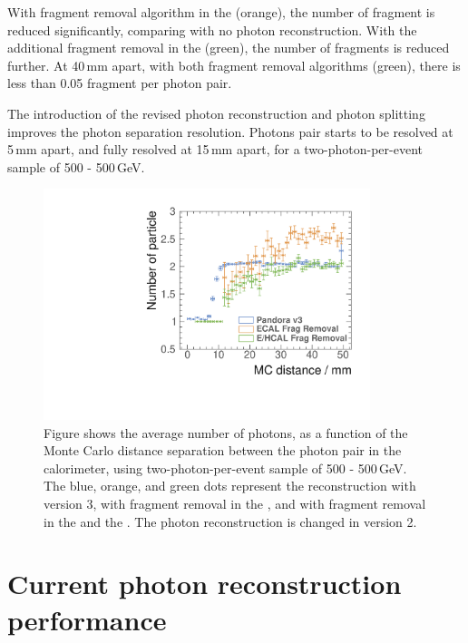 With fragment removal algorithm in the \ECAL (orange), the number of fragment is reduced significantly, comparing with no photon reconstruction. With the additional fragment removal in the \HCAL (green), the number of fragments is reduced further. At 40\,mm apart, with both fragment removal algorithms (green), there is less than 0.05 fragment per photon pair.

The introduction of the revised photon reconstruction and photon splitting improves the photon separation resolution. Photons pair starts to be resolved at 5\,mm apart, and fully resolved at 15\,mm apart, for a two-photon-per-event sample of 500 - 500\,GeV.



\begin{figure}[tbph]
\centering
\includegraphics[width=0.85\textwidth]{photon/DoubleCompareAlgs.pdf}
\caption[Average number of photons, as a function of the MC distance separation for different algorithms combinations.]
{Figure shows the average number of photons, as a function of the Monte Carlo distance separation between the photon pair in the calorimeter, using two-photon-per-event sample of 500 - 500\,GeV. The blue, orange, and green dots represent the reconstruction with \pandora version 3, with fragment removal in the \ECAL, and with fragment removal in the \ECAL and the \HCAL. The photon reconstruction is changed in \pandora version 2.}
\label{fig:photonDoubleCompareAlgs}
\end{figure}

\section{Current photon reconstruction performance}

